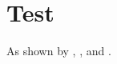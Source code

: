 \documentclass{article}
\begin{document}
\section{Test}\label{sec:test}
As shown by , , and .


\end{document}
